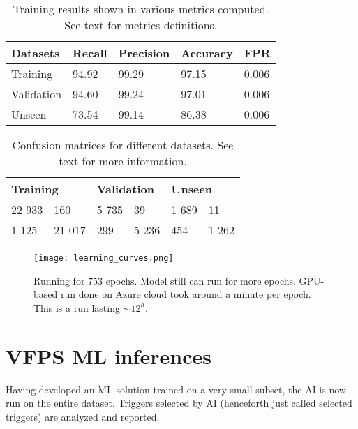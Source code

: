 \begin{table}[]
	\label{tab:trainres}
	\begin{tabular}{@{}lllll@{}}
		\toprule
		Datasets & Recall & Precision & Accuracy & FPR \\ \midrule
		Training & 94.92 & 99.29 & 97.15 & 0.006 \\
		Validation & 94.60 & 99.24 & 97.01 & 0.006 \\
		Unseen & 73.54 & 99.14 & 86.38 & 0.006 \\ \bottomrule
	\end{tabular}
	\caption{Training results shown in various metrics computed. See text for metrics definitions.}
\end{table}

\begin{table}[]
	\label{tab:traincfm}
	\begin{tabular}{@{}ll|ll|ll@{}}
		\toprule
		\multicolumn{2}{l|}{Training} & \multicolumn{2}{l|}{Validation} & \multicolumn{2}{l}{Unseen} \\ \midrule
		22 933 & 160 & 5 735 & 39 & 1 689 & 11 \\
		1 125 & 21 017 & 299 & 5 236 & 454 & 1 262 \\ \bottomrule
	\end{tabular}
	\caption{Confusion matrices for different datasets. See text for more information.}
	\end{table}

\begin{figure}
	\label{fig:lcurves}
	\centering
	\texttt{[image: learning\_curves.png]}
	\caption{Running for $753$ epochs. Model still can run for more epochs. GPU-based run done on Azure cloud took around a minute per epoch. This is a run lasting $\sim12^h$.}
\end{figure}

\section {VFPS ML inferences}
\label{sec:ml_vfps}

\par Having developed an ML solution trained on a very small subset, the AI is now run on the entire \vfps dataset.
Triggers selected by AI (henceforth just called selected triggers) are analyzed and reported.


